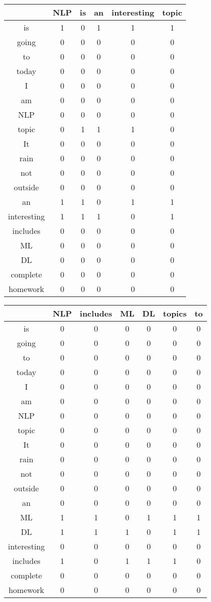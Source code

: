 \begin{center}
\begin{tabular}{||c|| c c c c c||}
\hline
&NLP&is&an&interesting&topic\\
\hline
is		&1&0&1&1&1\\
going		&0&0&0&0&0\\
to		&0&0&0&0&0\\
today		&0&0&0&0&0\\
I		&0&0&0&0&0\\
am		&0&0&0&0&0\\
NLP		&0&0&0&0&0\\
topic		&0&1&1&1&0\\
It		&0&0&0&0&0\\
rain		&0&0&0&0&0\\
not		&0&0&0&0&0\\
outside		&0&0&0&0&0\\
an		&1&1&0&1&1\\
interesting	&1&1&1&0&1\\
includes	&0&0&0&0&0\\
ML		&0&0&0&0&0\\
DL		&0&0&0&0&0\\
complete	&0&0&0&0&0\\
homework	&0&0&0&0&0\\
\hline
\end{tabular}

\begin{tabular}{||c|| c c c c c c||}
\hline
&NLP& includes& ML& DL& topics& to\\
\hline
is		&0&0&0&0&0&0\\
going		&0&0&0&0&0&0\\
to		&0&0&0&0&0&0\\
today		&0&0&0&0&0&0\\
I		&0&0&0&0&0&0\\
am		&0&0&0&0&0&0\\
NLP		&0&0&0&0&0&0\\
topic		&0&0&0&0&0&0\\
It		&0&0&0&0&0&0\\
rain		&0&0&0&0&0&0\\
not		&0&0&0&0&0&0\\
outside		&0&0&0&0&0&0\\
an		&0&0&0&0&0&0\\
ML		&1&1&0&1&1&1\\
DL		&1&1&1&0&1&1\\
interesting	&0&0&0&0&0&0\\
includes	&1&0&1&1&1&0\\
complete	&0&0&0&0&0&0\\
homework	&0&0&0&0&0&0\\
\hline
\end{tabular}


\end{center}
